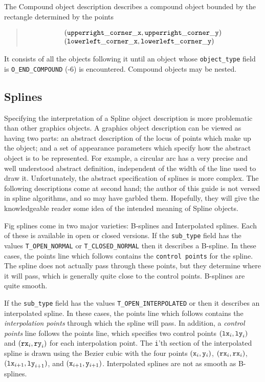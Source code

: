 The Compound object description describes a compound object
	bounded by the rectangle determined by the points
%
\begin{quote}
\[ \begin{array}{l}
	({\tt upperright\_corner\_x}, {\tt upperright\_corner\_y})	\\
	({\tt lowerleft\_corner\_x}, {\tt lowerleft\_corner\_y})
\end{array} \]
\end{quote}
%
It consists of all the objects following it until an object whose 
	{\tt object\_type} field is {\tt O\_END\_COMPOUND} (-6) is encountered.
Compound objects may be nested.

\subsection{Splines}
\label{s:splines}

Specifying the interpretation of a Spline object description is more problematic
	than other graphics objects.
A graphics object description can be viewed as having two parts:
	an abstract description of the locus of points which 
	make up the object; and a set of appearance parameters
	which specify how the abstract object is to be represented.
For example, a circular arc has a very precise and well understood abstract
	definition, independent of the width of the line used to
	draw it.
Unfortunately, the abstract specification of splines is more complex.
The following descriptions come at second hand; the author of this
	guide is not versed in spline algorithms, and so 
	may have garbled them.
Hopefully, they will give the knowledgeable reader some idea of the
	intended meaning of Spline objects.

Fig splines come in two major varieties: B-splines and Interpolated splines.
Each of these is available in open or closed versions.
If the {\tt sub\_type} field has the values {\tt T\_OPEN\_NORMAL}
	or {\tt T\_CLOSED\_NORMAL} then it describes a B-spline.
In these cases, the points line which follows contains the
	{\tt control points} for the spline.
The spline does not actually pass through these points, but they determine
	where it will pass, which is generally quite close to the control
	points.
B-splines are quite smooth.

If the {\tt sub\_type} field has the values {\tt T\_OPEN\_INTERPOLATED}	or
	 then it describes an
	interpolated spline.
In these cases, the points line which follows contains the
	{\em interpolation points} through which the spline will pass.
In addition, a {\em control points} line follows the points line,
	which specifies two control points $({\tt lx}_i, {\tt ly}_i)$ and
	$({\tt rx}_i, {\tt ry}_i)$ for each interpolation point.
The {\tt i}'th section of the interpolated spline is drawn using the
	Bezier cubic with the four points
	$({\tt x}_i, {\tt y}_i)$,  \linebreak $({\tt rx}_i, {\tt rx}_i)$,  
	$({\tt lx}_{i+1}, {\tt ly}_{i+1})$,
	and $({\tt x}_{i+1}, {\tt y}_{i+1})$.
Interpolated splines are not as smooth as B-splines.

